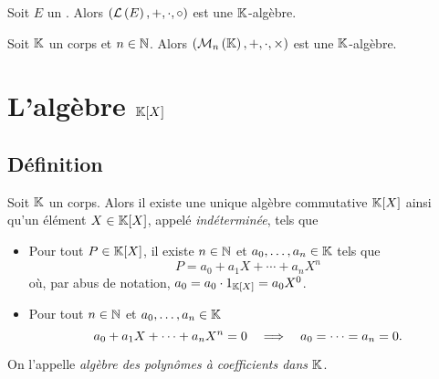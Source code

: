 \documentclass{magnolia}
\begin{document}
\begin{proposition}
Soit $E$ un \Kev. Alors $(\mathcal{L}\left(E\right),+,\cdot,\circ)$ est une $\mathbb{K}$-algèbre.
\end{proposition}


\begin{proposition}
Soit $\mathbb{K}$ un corps et $n\in\mathbb{N}$. Alors $(\mathcal{M}_{n}\left(\mathbb{K}\right),+,\cdot,\times)$ est une $\mathbb{K}$-algèbre.
\end{proposition}


\section{L'algèbre $\polyK$}

\subsection{Définition}
\begin{definition}
Soit $\mathbb{K}$ un corps. Alors il existe une unique algèbre commutative $\polyK$ ainsi
qu'un élément $X\in\polyK$, appelé \emph{indéterminée}, tels que
\begin{itemize}
\item Pour tout $P\in\polyK$, il existe $n\in\mathbb{N}$ et $a_0,\ldots,a_n\in\mathbb{K}$ tels
  que
  \[P=a_0+a_1 X+\cdots+a_n X^n\]
  où, par abus de notation, $a_0=a_0\cdot 1_{\polyK}=a_0 X^0$.
\item Pour tout $n\in\mathbb{N}$ et $a_0,\ldots,a_n\in\mathbb{K}$
  \[a_0+a_1X+\cdots+a_n X^n=0 \quad\Longrightarrow\quad  a_0=\cdots=a_n=0.\]
\end{itemize}
On l'appelle \emph{algèbre des polynômes à coefficients dans $\mathbb{K}$}.
\end{definition}
\end{document}
